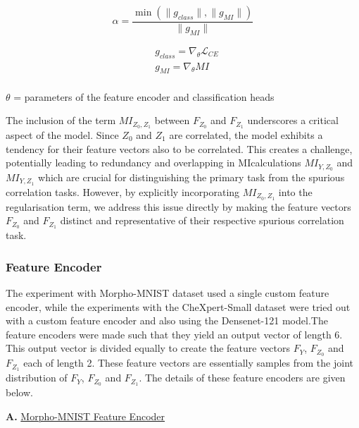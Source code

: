 \documentclass[12pt,DIV14,BCOR12mm,a4paper,footinclude=false,headinclude,parskip=half-,twoside,openright,cleardoublepage=empty,toc=index,bibliography=totoc,listof=totoc]{scrreprt}
\numberwithin{equation}{chapter}
\begin{document}
\begin{equation}\label{eq:alpha}
\alpha = \frac{\min \left( \| g_{class} \|, \| g_{MI} \| \right)}{\| g_{MI} \|}
\end{equation}

\begin{equation}
\begin{split}
    & g_{class}=\nabla_{\theta}\mathcal{L}_{CE}\\
    & g_{MI}=\nabla_{\theta}MI\\
\end{split}
\end{equation}

\begin{center}
$\theta$ = parameters of the feature encoder and classification heads
\end{center}

The inclusion of the term $MI_{Z_0,Z_1}$ between $F_{Z_0}$ and $F_{Z_1}$ underscores a critical aspect of the model. Since $Z_0$ and $Z_1$ are correlated, the model exhibits a tendency for their feature vectors also to be correlated. This creates a challenge, potentially leading to redundancy and overlapping in MIcalculations $MI_{Y,Z_0}$ and $MI_{Y,Z_1}$ which are crucial for distinguishing the primary task from the spurious correlation tasks. However, by explicitly incorporating $MI_{Z_0,Z_1}$ into the regularisation term, we address this issue directly by making the feature vectors $F_{Z_0}$ and $F_{Z_1}$ distinct and representative of their respective spurious correlation task.  

\subsubsection{Feature Encoder}
The experiment with Morpho-MNIST dataset used a single custom feature encoder, while the experiments with the CheXpert-Small dataset were tried out with a custom feature encoder and also using the Densenet-121 model.The feature encoders were made such that they yield an output vector of length 6. This output vector is divided equally to create the feature vectors $F_Y$, $F_{Z_0}$ and $F_{Z_1}$ each of length 2. These feature vectors are essentially samples from the joint distribution of $F_Y$, $F_{Z_0}$ and $F_{Z_1}$. The details of these feature encoders are given below.

\vspace{0.5cm}
\textbf{A.} \underline{Morpho-MNIST Feature Encoder}\\
\end{document}
